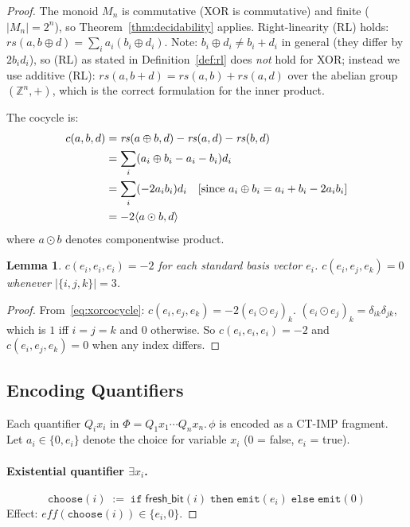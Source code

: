 \documentclass[acmsmall,sigplan,anonymous,review,screen]{acmart}
\theoremstyle{plain}
\newtheorem{lemma}[theorem]{Lemma}
\theoremstyle{definition}
\newcommand{\rs}{\mathit{rs}}
\begin{document}
\begin{proof}
The monoid $M_n$ is commutative (XOR is commutative) and finite
($|M_n| = 2^n$), so Theorem~\ref{thm:decidability} applies.
Right-linearity (RL) holds:
$\rs(a, b \oplus d) = \sum_i a_i (b_i \oplus d_i)$.
Note: $b_i \oplus d_i \neq b_i + d_i$ in general (they differ by $2 b_i d_i$),
so (RL) as stated in Definition~\ref{def:rl} does \emph{not} hold for XOR;
instead we use additive (RL): $\rs(a, b + d) = \rs(a,b) + \rs(a,d)$
over the abelian group $(\mathbb{Z}^n, +)$, which is the correct
formulation for the inner product.

The cocycle is:
\begin{align}
  c(a, b, d) &= \rs(a \oplus b, d) - \rs(a, d) - \rs(b, d) \notag \\
  &= \sum_i (a_i \oplus b_i - a_i - b_i) d_i \notag \\
  &= \sum_i (- 2 a_i b_i) d_i \quad [\text{since } a_i \oplus b_i = a_i + b_i - 2 a_i b_i] \notag \\
  &= -2 \langle a \odot b, d \rangle \label{eq:xorcocycle}
\end{align}
where $a \odot b$ denotes componentwise product.

\begin{lemma}
  $c(e_i, e_i, e_i) = -2$ for each standard basis vector $e_i$.
  $c(e_i, e_j, e_k) = 0$ whenever $|\{i,j,k\}| = 3$.
\end{lemma}
\begin{proof}
  From~\eqref{eq:xorcocycle}: $c(e_i, e_j, e_k) = -2 (e_i \odot e_j)_k$.
  $(e_i \odot e_j)_k = \delta_{ik} \delta_{jk}$, which is $1$ iff $i = j = k$
  and $0$ otherwise.  So $c(e_i, e_i, e_i) = -2$ and $c(e_i, e_j, e_k) = 0$
  when any index differs.
\end{proof}

\subsection{Encoding Quantifiers}
\label{appendix:encoding}

Each quantifier $Q_i x_i$ in $\Phi = Q_1 x_1 \cdots Q_n x_n.\, \phi$
is encoded as a CT-IMP fragment.  Let $a_i \in \{0, e_i\}$ denote the
choice for variable $x_i$ (0 = false, $e_i$ = true).

\paragraph{Existential quantifier $\exists x_i$.}
\[
  \texttt{choose}(i) \;:=\; \texttt{if}\;\mathsf{fresh\_bit}(i)\;
    \texttt{then}\; \texttt{emit}(e_i)\;
    \texttt{else}\; \texttt{emit}(0)
\]
Effect: $\mathit{eff}(\texttt{choose}(i)) \in \{e_i, 0\}$.


\end{proof}
\end{document}

